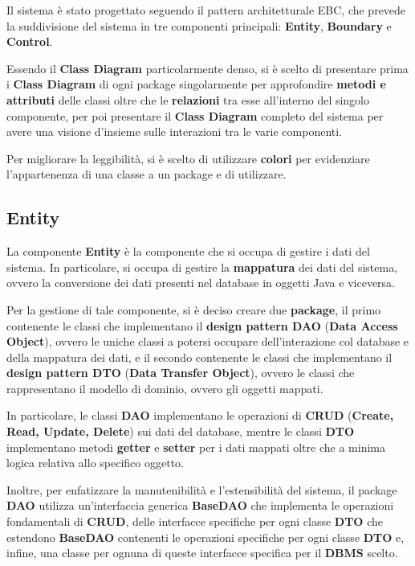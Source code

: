 Il sistema è stato progettato seguendo il pattern architetturale EBC, che prevede
la suddivisione del sistema in tre componenti principali: \textbf{Entity}, \textbf{Boundary}
e \textbf{Control}.

\begin{note}
  Essendo il \textbf{Class Diagram} particolarmente denso, si è scelto di presentare
  prima i \textbf{Class Diagram} di ogni package singolarmente per approfondire
  \textbf{metodi e attributi} delle classi oltre che le \textbf{relazioni} tra esse 
  all'interno del singolo componente, per poi presentare il \textbf{Class Diagram}
  completo del sistema per avere una visione d'insieme sulle interazioni tra le
  varie componenti.

  Per migliorare la leggibilità, si è scelto di utilizzare \textbf{colori} per
  evidenziare l'appartenenza di una classe a un package e di utilizzare.
\end{note}

\subsection{Entity}

La componente \textbf{Entity} è la componente che si occupa di gestire i dati del sistema.
In particolare, si occupa di gestire la \textbf{mappatura} dei dati del sistema, ovvero
la conversione dei dati presenti nel database in oggetti Java e viceversa.

Per la gestione di tale componente, si è deciso creare due \textbf{package}, il primo
contenente le classi che implementano il \textbf{design pattern DAO}
(\textbf{Data Access Object}), ovvero le uniche classi a potersi occupare dell'interazione
col database e della mappatura dei dati, e il secondo contenente le classi che implementano il
\textbf{design pattern DTO} (\textbf{Data Transfer Object}), ovvero le classi che
rappresentano il modello di dominio, ovvero gli oggetti mappati.

In particolare, le classi \textbf{DAO} implementano le operazioni di \textbf{CRUD} (\textbf{Create, Read, Update, Delete})
sui dati del database, mentre le classi \textbf{DTO} implementano metodi \textbf{getter} e \textbf{setter}
per i dati mappati oltre che a minima logica relativa allo specifico oggetto.

Inoltre, per enfatizzare la manutenibilità e l'estensibilità del sistema, il package 
\textbf{DAO} utilizza un'interfaccia generica \textbf{BaseDAO} che implementa le operazioni
fondamentali di \textbf{CRUD}, delle interfacce specifiche per ogni classe \textbf{DTO} 
che estendono \textbf{BaseDAO} contenenti le operazioni specifiche per ogni classe \textbf{DTO}
e, infine, una classe per ognuna di queste interfacce specifica per il \textbf{DBMS} scelto.

